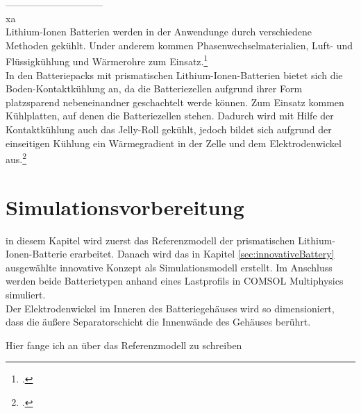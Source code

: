 \newpage
------------------------------\\
xa\\%
Lithium-Ionen Batterien werden in der Anwendunge durch verschiedene Methoden gekühlt. Under anderem kommen Phasenwechselmaterialien, Luft- und Flüssigkühlung und Wärmerohre zum Einsatz.\footcite[Vgl.][S. 1,2]{Mohammed.2018}\\
In den Batteriepacks mit prismatischen Lithium-Ionen-Batterien bietet sich die Boden-Kontaktkühlung an, da die Batteriezellen aufgrund ihrer Form platzsparend nebeneinandner geschachtelt werde können. Zum Einsatz kommen Kühlplatten, auf denen die Batteriezellen stehen. %
Dadurch wird mit Hilfe der Kontaktkühlung auch das Jelly-Roll gekühlt, jedoch bildet sich aufgrund der einseitigen Kühlung ein Wärmegradient in der Zelle und dem Elektrodenwickel aus.\footcite[Vgl.][S. 2107]{Inui.2007}

\newpage
\section{Simulationsvorbereitung}\label{sec:SimulationPREP}

in diesem Kapitel wird zuerst das Referenzmodell der prismatischen Lithium-Ionen-Batterie erarbeitet. Danach wird das in Kapitel \ref{sec:innovativeBattery} ausgewählte innovative Konzept als Simulationsmodell erstellt. Im Anschluss werden beide Batterietypen anhand eines Lastprofils in COMSOL Multiphysics\textsuperscript{\textregistered} simuliert.\\



Der Elektrodenwickel im Inneren des Batteriegehäuses wird so dimensioniert, dass die äußere Separatorschicht die Innenwände des Gehäuses berührt.

Hier fange ich an über das Referenzmodell zu schreiben


	